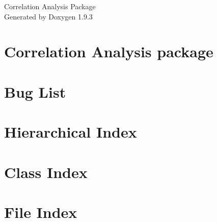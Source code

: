 \documentclass[twoside]{book}
\newcommand{\+}{\discretionary{\mbox{\scriptsize$\hookleftarrow$}}{}{}}
\newcommand{\clearemptydoublepage}{%
    \newpage{\pagestyle{empty}\cleardoublepage}%
  }
\begin{document}
  \raggedbottom
    \hypersetup{pageanchor=false,
                bookmarksnumbered=true,
                pdfencoding=unicode
               }
  \begin{titlepage}
  \vspace*{7cm}
  \begin{center}%
  {\Large Correlation Analysis Package}\\
  \vspace*{1cm}
  {\large Generated by Doxygen 1.9.3}\\
  \end{center}
  \end{titlepage}
  \clearemptydoublepage
  \tableofcontents
  \clearemptydoublepage
  \hypersetup{pageanchor=true}
\chapter{Correlation Analysis package}
\label{index}\hypertarget{index}{}
\chapter{Bug List}
\label{bug}

\chapter{Hierarchical Index}

\chapter{Class Index}

\chapter{File Index}

\end{document}
